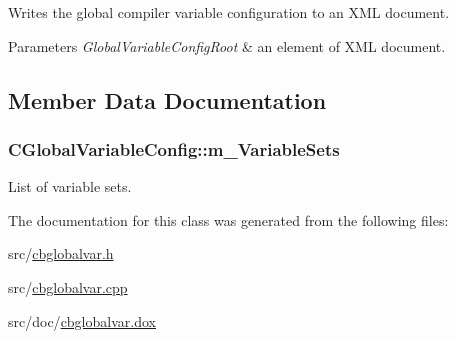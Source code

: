 Writes the global compiler variable configuration to an X\-M\-L document. 


\begin{DoxyParams}{Parameters}
{\em Global\-Variable\-Config\-Root} & an element of X\-M\-L document. \\
\hline
\end{DoxyParams}


\subsection{Member Data Documentation}
\hypertarget{classCGlobalVariableConfig_a19fe97fb18fa079b3f8398fd9c75e46e}{
\subsubsection[{m\-\_\-\-Variable\-Sets}]{\setlength{\rightskip}{0pt plus 5cm}C\-Global\-Variable\-Config\-::m\-\_\-\-Variable\-Sets\hspace{0.3cm}{\ttfamily [private]}}}\label{classCGlobalVariableConfig_a19fe97fb18fa079b3f8398fd9c75e46e}


List of variable sets. 



The documentation for this class was generated from the following files\-:\begin{DoxyCompactItemize}
\item 
src/\hyperlink{cbglobalvar_8h}{cbglobalvar.\-h}\item 
src/\hyperlink{cbglobalvar_8cpp}{cbglobalvar.\-cpp}\item 
src/doc/\hyperlink{cbglobalvar_8dox}{cbglobalvar.\-dox}\end{DoxyCompactItemize}
